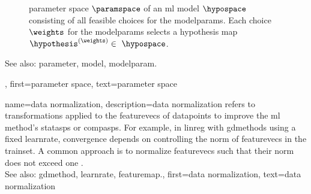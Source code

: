 {{\begin{figure}[H]
\begin{center}
			\end{center} 
		\caption{\Gls{parameter} space $\paramspace$ of an \gls{ml} \gls{model} $\hypospace$ consisting of all 
			feasible choices for the \glspl{modelparam}. Each choice $\weights$ for the \glspl{modelparam} 
			selects a \gls{hypothesis} \gls{map} $\hypothesis^{(\weights)} \in \hypospace$.
			\label{fig_param_space_dict}} 
		\end{figure}
		See also: \gls{parameter}, \gls{model}, \gls{modelparam}.},
	first={parameter space},
	text={parameter space}
}

{name={data normalization},
	description={\Gls{data} normalization refers to transformations 
		applied to the \glspl{featurevec} of \glspl{datapoint} to improve the \gls{ml} method's 
		\glspl{statasp} or \glspl{compasp}. For example, in \gls{linreg} with \glspl{gdmethod} using 
		a fixed \gls{learnrate}, \gls{convergence} depends on controlling the \gls{norm} of \glspl{featurevec} 
		in the \gls{trainset}. A common approach is to normalize \glspl{featurevec} such that their 
		\gls{norm} does not exceed one \cite[Ch.\ 5]{MLBasics}.
				\\
		See also:  \gls{gdmethod}, \gls{learnrate}, \gls{featuremap}.},
	first={data normalization},
	text={data normalization}
}

